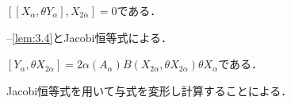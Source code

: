 \begin{lem}\label{lem:3.5}
  $[[X_{\alpha}, \theta Y_{\alpha}], X_{2\alpha}] = 0$である．
\end{lem}
\begin{npfwn}
  --\ref{lem:3.4}とJacobi恒等式による．
\end{npfwn}

\begin{lem}\label{lem:3.6}
  $[Y_{\alpha},\theta X_{2\alpha}] = 2\alpha(A_{\alpha})B(X_{2\alpha}, \theta X_{2\alpha})\theta X_{\alpha} $である．  
\end{lem}
\begin{npfwn}
  Jacobi恒等式を用いて与式を変形し計算することによる．
\end{npfwn}



